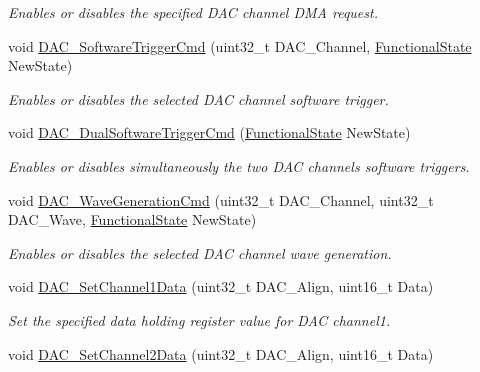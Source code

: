 \begin{DoxyCompactItemize}
\begin{DoxyCompactList}\small\item\em Enables or disables the specified D\+AC channel D\+MA request. \end{DoxyCompactList}\item 
void \hyperlink{group___d_a_c___private___functions_ga46f9f7f6b9520a86e300fe966afe5fb3}{D\+A\+C\+\_\+\+Software\+Trigger\+Cmd} (uint32\+\_\+t D\+A\+C\+\_\+\+Channel, \hyperlink{group___exported__types_gac9a7e9a35d2513ec15c3b537aaa4fba1}{Functional\+State} New\+State)
\begin{DoxyCompactList}\small\item\em Enables or disables the selected D\+AC channel software trigger. \end{DoxyCompactList}\item 
void \hyperlink{group___d_a_c___private___functions_gab4d3b364a6b184dcd65f3b294ebf56dc}{D\+A\+C\+\_\+\+Dual\+Software\+Trigger\+Cmd} (\hyperlink{group___exported__types_gac9a7e9a35d2513ec15c3b537aaa4fba1}{Functional\+State} New\+State)
\begin{DoxyCompactList}\small\item\em Enables or disables simultaneously the two D\+AC channels software triggers. \end{DoxyCompactList}\item 
void \hyperlink{group___d_a_c___private___functions_gabd51ae6880821d4dcd923969ec19a19e}{D\+A\+C\+\_\+\+Wave\+Generation\+Cmd} (uint32\+\_\+t D\+A\+C\+\_\+\+Channel, uint32\+\_\+t D\+A\+C\+\_\+\+Wave, \hyperlink{group___exported__types_gac9a7e9a35d2513ec15c3b537aaa4fba1}{Functional\+State} New\+State)
\begin{DoxyCompactList}\small\item\em Enables or disables the selected D\+AC channel wave generation. \end{DoxyCompactList}\item 
void \hyperlink{group___d_a_c___private___functions_gad06b4230d2b17d1d13f41dce4c782461}{D\+A\+C\+\_\+\+Set\+Channel1\+Data} (uint32\+\_\+t D\+A\+C\+\_\+\+Align, uint16\+\_\+t Data)
\begin{DoxyCompactList}\small\item\em Set the specified data holding register value for D\+AC channel1. \end{DoxyCompactList}\item 
void \hyperlink{group___d_a_c___private___functions_ga44e12006ec186791378d132da8541552}{D\+A\+C\+\_\+\+Set\+Channel2\+Data} (uint32\+\_\+t D\+A\+C\+\_\+\+Align, uint16\+\_\+t Data)

\end{DoxyCompactItemize}
